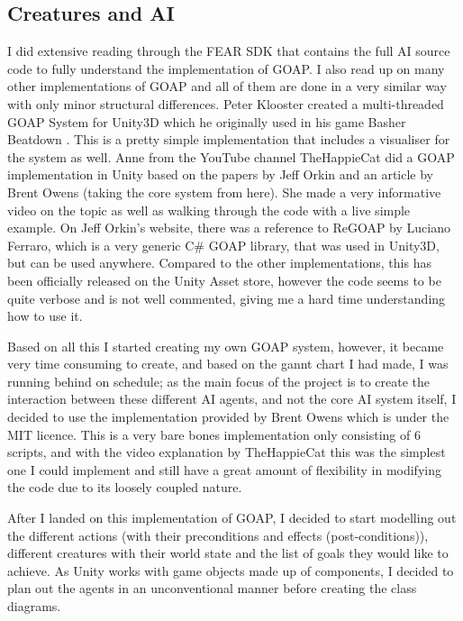 \documentclass[12pt]{report}
\begin{document}
\subsection{Creatures and AI}
I did extensive reading through the FEAR SDK\cite{fearSDK} that contains the full AI source code to fully understand the implementation of GOAP.
I also read up on many other implementations of GOAP and all of them are done in a very similar way with only minor structural differences. 
Peter Klooster created a multi-threaded GOAP System for Unity3D which he originally used in his game Basher Beatdown \cite{basherGoap}. This is a pretty simple implementation that includes a visualiser for the system as well.
Anne from the YouTube channel TheHappieCat did a GOAP implementation in Unity \cite{happieGoapVideo} based on the papers by Jeff Orkin and an article by Brent Owens \cite{brentOwensGoap} (taking the core system from here). She made a very informative video on the topic as well as walking through the code with a live simple example.
On Jeff Orkin's website, there was a reference to ReGOAP by Luciano Ferraro, which is a very generic C\# GOAP library, that was used in Unity3D, but can be used anywhere. Compared to the other implementations, this has been officially released on the Unity Asset store, however the code seems to be quite verbose and is not well commented, giving me a hard time understanding how to use it.

Based on all this I started creating my own GOAP system, however, it became very time consuming to create, and based on the gannt chart I had made, I was running behind on schedule; as the main focus of the project is to create the interaction between these different AI agents, and not the core AI system itself, I decided to use the implementation provided by Brent Owens \cite{brentOwensGoapCode} which is under the MIT licence. This is a very bare bones implementation only consisting of 6 scripts, and with the video explanation by TheHappieCat this was the simplest one I could implement and still have a great amount of flexibility in modifying the code due to its loosely coupled nature.

After I landed on this implementation of GOAP, I decided to start modelling out the different actions (with their preconditions and effects (post-conditions)), different creatures with their world state and the list of goals they would like to achieve. As Unity works with game objects made up of components, I decided to plan out the agents in an unconventional manner before creating the class diagrams. 
\end{document}

